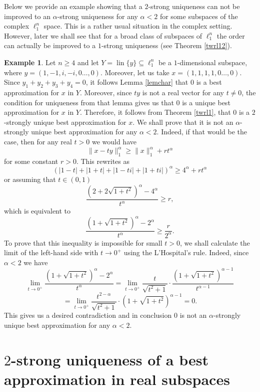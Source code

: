 \documentclass[12pt, reqno]{amsart}
\theoremstyle{definition}
\newtheorem{example}[twr]{Example}
\theoremstyle{remark}
\numberwithin{equation}{section}
\DeclareMathOperator{\lin}{lin}
\begin{document}
Below we provide an example showing that a $2$-strong uniqueness can not be improved to an $\alpha$-strong uniqueness for any $\alpha<2$ for some subspaces of the complex $\ell_1^n$ space. This is a rather usual situation in the complex setting. However, later we shall see that for a broad class of subspaces of $\ell_1^n$ the order can actually be improved to a $1$-strong uniqueness (see Theorem \ref{twrl12}).

\begin{example}
Let $n \geq 4$ and let $Y = \lin\{y\} \subseteq \ell_1^n$ be a $1$-dimensional subspace, where $y = (1, -1, i, -i, 0 \ldots, 0)$. Moreover, let us take $x = (1, 1, 1, 1, 0 \ldots, 0)$. Since $y_1 + y_2 + y_3 + y_4 =0$, it follows Lemma \ref{lemchar} that $0$ is a best approximation for $x$ in $Y$. Moreover, since $ty$ is not a real vector for any $t \neq 0$, the condition for uniqueness from that lemma gives us that $0$ is a unique best approximation for $x$ in $Y$. Therefore, it follows from Theorem \ref{twrl1}, that $0$ is a $2$-strongly unique best approximation for $x$. We shall prove that it is not an $\alpha$-strongly unique best approximation for any $\alpha<2$. Indeed, if that would be the case, then for any real $t>0$ we would have
$$\|x-ty\|^{\alpha}_1 \geq \|x\|_1^{\alpha} + rt^{\alpha}$$
for some constant $r>0$. This rewrites as
$$\left ( |1-t| + |1+t| + |1-ti| + |1+ti| \right )^{\alpha} \geq 4^{\alpha} + rt^{\alpha}$$
or assuming that $ t \in (0, 1)$
$$\frac{\left (2 + 2\sqrt{1+t^2} \right )^{\alpha} - 4^{\alpha}}{t^{\alpha}} \geq r,$$
which is equivalent to
$$\frac{\left (1 + \sqrt{1+t^2} \right )^{\alpha} - 2^{\alpha}}{t^{\alpha}} \geq \frac{r}{2^{\alpha}}.$$
To prove that this inequality is impossible for small $t>0$, we shall calculate the limit of the left-hand side with $t \to 0^{+}$ using the L'Hospital's rule. Indeed, since $\alpha<2$ we have
$$\lim_{t \to 0^{+}} \frac{\left (1 + \sqrt{1+t^2} \right )^{\alpha} - 2^{\alpha}}{t^{\alpha}} = \lim_{t \to 0^{+}} \frac{t}{\sqrt{t^2+1}} \cdot \frac{\left (1 + \sqrt{1+t^2} \right )^{\alpha-1}}{t^{\alpha-1}}$$
$$=\lim_{t \to 0^{+}} \frac{t^{2-\alpha}}{\sqrt{t^2+1}} \cdot \left (1 + \sqrt{1+t^2} \right )^{\alpha-1} = 0.$$
This gives us a desired contradiction and in conclusion $0$ is not an $\alpha$-strongly unique best approximation for any $\alpha<2$.
\end{example}

\section{$2$-strong uniqueness of a best approximation in real subspaces}
\label{sectionreal}
\end{document}
